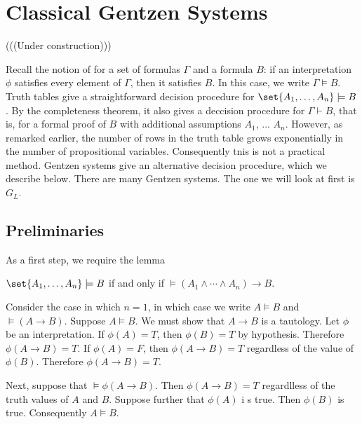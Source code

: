 
\section{Classical Gentzen Systems}

(((Under construction)))

\innertableofcontents

Recall the notion of  for a set of formulas $\Gamma$ and a formula $B$: if an interpretation $\phi$ satisfies every element of $\Gamma$, then it satisfies $B$.  In this case, we write $\Gamma \models B$.  Truth tables give a straightforward decision procedure for $\set{A_1, \ldots, A_n} \models B$. By the completeness theorem, it also gives a deccision procedure for $\Gamma \vdash B$, that is, for a formal proof of $B$ with additional assumptions $A_1$, ... $A_n$. However, as remarked earlier, the number of rows in the truth table grows exponentially in the number of propositional variables.  Consequently tnis is not a practical method.  Gentzen systems give an alternative decision procedure, which we describe below.  There are many Gentzen systems.  The one we will look at first is $G_L$.




\subsection{Preliminaries}

As a first step, we require the lemma

\begin{lemma}
$\set{A_1, \ldots, A_n} \models B$ if and only if $\models (A_1 \land \cdots \land A_n) \to B$.
\end{lemma}

Consider the case in which $n= 1$, in which case we write $A \models B$ and
$\models (A \to B)$.  Suppose $A \models B$. We must show that $A \to B$
 is a tautology.  Let $\phi$ be an interpretation.  If $\phi(A) = T$, then
$\phi(B) = T$ by hypothesis.  Therefore $\phi(A \to B) = T$.  If $\phi(A) = F$, then $\phi(A \to B) = T$ regardless of the value of $\phi(B)$.  Therefore $\phi(A \to B) = T$.

Next, suppose that $\models \phi(A \to B)$.  Then $\phi(A \to B) = T$ regardlless of the truth values of $A$ and $B$.  Suppose further that $\phi(A)$ i s true. Then $\phi(B)$ is true.  Consequently $A \models B$.

